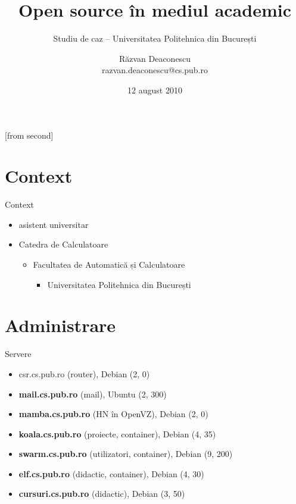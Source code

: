 \documentclass{beamer}
\title[Open source în mediul academic]{Open source în mediul academic}
\subtitle{Studiu de caz -- Universitatea Politehnica din București}
\institute{Întâlnirile lunare RLUG -- August 2010}
\author[Răzvan Deaconescu]{Răzvan Deaconescu\\
	razvan.deaconescu@cs.pub.ro}
\date{12 august 2010}
\begin{document}
[from second]


\frame{\titlepage}

\section{Context}

\begin{frame}{Context}
	\begin{itemize}		%
		\item asistent universitar
		\item Catedra de Calculatoare
			\begin{itemize}
				\item Facultatea de Automatică și Calculatoare
					\begin{itemize}
						\item Universitatea Politehnica din București
					\end{itemize}
			\end{itemize}
	\end{itemize}
\end{frame}

\frame{\tableofcontents}

\section{Administrare}

\frame{\tableofcontents[currentsection]}

\begin{frame}{Servere}
	\begin{itemize}
		\item csr.cs.pub.ro (router), Debian (2, 0)
		\item \textbf{mail.cs.pub.ro} (mail), Ubuntu (2, 300)
		\item \textbf{mamba.cs.pub.ro} (HN în OpenVZ), Debian (2, 0)
		\item \textbf{koala.cs.pub.ro} (proiecte, container), Debian (4, 35)
		\item \textbf{swarm.cs.pub.ro} (utilizatori, container), Debian
		(9, 200)
		\item \textbf{elf.cs.pub.ro} (didactic, container), Debian (4, 30)
		\item \textbf{cursuri.cs.pub.ro} (didactic), Debian (3, 50)
	\end{itemize}
\end{frame}
\end{document}
